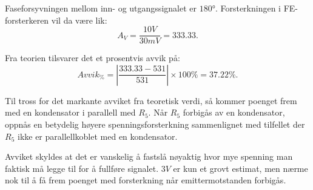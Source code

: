         Faseforsyvningen mellom inn- og utgangssignalet er $\ang{180}$. Forsterkningen i FE-forsterkeren vil da være lik:
        \begin{equation*}
            A_V = \frac{10V}{30mV} = 333.33.
        \end{equation*}

        Fra teorien tilsvarer det et prosentvis avvik på:
        \begin{equation*}
            Avvik_{\%} = \left| \frac{333.33 - 531}{531} \right| \times 100\% = 37.22\%. 
        \end{equation*}

        Til tross for det markante avviket fra teoretisk verdi, så kommer poenget frem med en kondensator i parallell med $R_5$. Når $R_5$ forbigås av en kondensator, oppnås en betydelig høyere spenningsforsterkning sammenlignet med tilfellet der $R_5$ ikke er parallellkoblet med en kondensator. 

        Avviket skyldes at det er vanskelig å fastslå nøyaktig hvor mye spenning man faktisk må legge til for å fullføre signalet. $3V$ er kun et grovt estimat, men nærme nok til å få frem poenget med forsterkning når emittermotstanden forbigås. 
        
        
